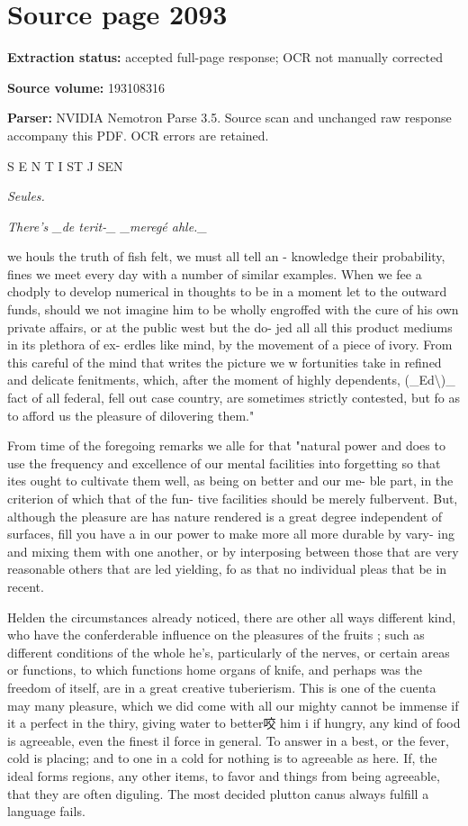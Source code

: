 \clearpage
\section{Source page 2093}
\textbf{Extraction status:} accepted full-page response; OCR not manually corrected\par
\textbf{Source volume:} 193108316\par
\textbf{Parser:} NVIDIA Nemotron Parse 3.5. Source scan and unchanged raw response accompany this PDF. OCR errors are retained.\par\medskip
S E N T I ST J SEN\par\medskip
{\small\itshape Seules.\par}\medskip
{\small\itshape There’s \_de terit-\_
\_meregé ahle.\_\par}\medskip
we houls the truth of fish felt, we must all tell an -
knowledge their probability, fines we meet every day with a number of similar examples. When we fee a
chodply to develop numerical in thoughts to be in a
moment let to the outward funds, should we not imagine him to be wholly engroffed with the cure of his own private affairs, or at the public west but the do-
jed all all this product mediums in its plethora of ex-
erdles like mind, by the movement of a piece of ivory. From this careful of the mind that writes the picture we
w fortunities take in refined and delicate fenitments, which, after the moment of highly dependents, (\_Ed\textbackslash{})\_
fact of all federal, fell out case country, are sometimes strictly contested, but fo as to afford us the pleasure of dilovering them."\par\medskip
From time of the foregoing remarks we alle for that "natural power and does to use the frequency and excellence of our mental facilities into forgetting so that ites ought to cultivate them well, as being on better and our me-
ble part, in the criterion of which that of the fun-
tive facilities should be merely fulbervent. But, although the pleasure are has nature rendered is a great degree independent of surfaces, fill you have a in our power to make more all more durable by vary-
ing and mixing them with one another, or by interposing between those that are very reasonable others that are led yielding, fo as that no individual pleas that be in recent.\par\medskip
Helden the circumstances already noticed, there are other all ways different kind, who have the conferderable influence on the pleasures of the fruits ; such as different conditions of the whole he's, particularly of the nerves, or certain areas or functions, to which functions home organs of knife, and perhaps was the freedom of itself, are in a great creative tuberierism. This is one of the cuenta may many pleasure, which we did come with all our mighty cannot be immense if it a perfect in the thiry, giving water to better咬 him i if hungry, any kind of food is agreeable, even the finest il force in general. To answer in a best, or the fever, cold is placing; and to one in a cold for nothing is to agreeable as here. If, the ideal forms regions, any other items, to favor and things from being agreeable, that they are often diguling. The most decided plutton canus always fulfill a language fails.\par\medskip
